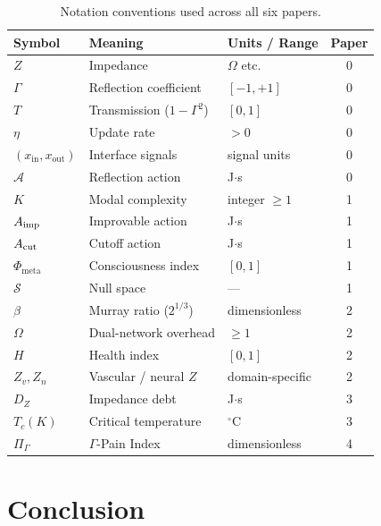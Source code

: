 \documentclass[aps,pre,twocolumn,superscriptaddress,floatfix]{revtex4-2}
\begin{document}
\begin{table}[h]
\caption{Notation conventions used across all six papers.}
\label{tab:notation}
\begin{ruledtabular}
\begin{tabular}{lllc}
\textbf{Symbol} & \textbf{Meaning}
  & \textbf{Units / Range} & \textbf{Paper} \\
\hline
$Z$ & Impedance & $\Omega$ etc.\ & 0 \\
$\Gamma$ & Reflection coefficient
  & $[-1,+1]$ & 0 \\
$T$ & Transmission ($1{-}\Gamma^2$)
  & $[0,1]$ & 0 \\
$\eta$ & Update rate & $>0$ & 0 \\
$(x_{\text{in}},x_{\text{out}})$ & Interface signals
  & signal units & 0 \\
$\mathcal{A}$ & Reflection action & J$\cdot$s & 0 \\
$K$ & Modal complexity & integer $\ge 1$ & 1 \\
$A_{\text{imp}}$ & Improvable action & J$\cdot$s & 1 \\
$A_{\text{cut}}$ & Cutoff action & J$\cdot$s & 1 \\
$\Phi_{\text{meta}}$ & Consciousness index
  & $[0,1]$ & 1 \\
$\mathcal{S}$ & Null space & --- & 1 \\
$\beta$ & Murray ratio ($2^{1/3}$)
  & dimensionless & 2 \\
$\Omega$ & Dual-network overhead
  & $\ge 1$ & 2 \\
$H$ & Health index & $[0,1]$ & 2 \\
$Z_v,Z_n$ & Vascular / neural $Z$
  & domain-specific & 2 \\
$D_Z$ & Impedance debt & J$\cdot$s & 3 \\
$T_c(K)$ & Critical temperature
  & $^\circ$C & 3 \\
$\Pi_\Gamma$ & $\Gamma$-Pain Index
  & dimensionless & 4 \\
\end{tabular}
\end{ruledtabular}
\end{table}


\section{Conclusion}
\label{sec:conclusion}
\end{document}
